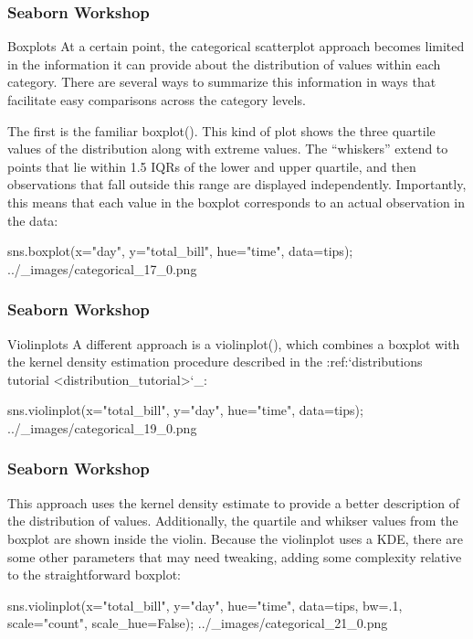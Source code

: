 \begin{frame}[fragile]
\frametitle{Seaborn Workshop}
\large
Boxplots
At a certain point, the categorical scatterplot approach becomes limited in the information it can provide about the distribution of values within each category. There are several ways to summarize this information in ways that facilitate easy comparisons across the category levels.

The first is the familiar boxplot(). This kind of plot shows the three quartile values of the distribution along with extreme values. The “whiskers” extend to points that lie within 1.5 IQRs of the lower and upper quartile, and then observations that fall outside this range are displayed independently. Importantly, this means that each value in the boxplot corresponds to an actual observation in the data:

sns.boxplot(x="day", y="total_bill", hue="time", data=tips);
../_images/categorical_17_0.png
\end{frame}
\begin{frame}[fragile]
\frametitle{Seaborn Workshop}
\large

Violinplots
A different approach is a violinplot(), which combines a boxplot with the kernel density estimation procedure described in the :ref:`distributions tutorial <distribution_tutorial>`_:

sns.violinplot(x="total_bill", y="day", hue="time", data=tips);
../_images/categorical_19_0.png
\end{frame}
\begin{frame}[fragile]
\frametitle{Seaborn Workshop}
\large
This approach uses the kernel density estimate to provide a better description of the distribution of values. Additionally, the quartile and whikser values from the boxplot are shown inside the violin. Because the violinplot uses a KDE, there are some other parameters that may need tweaking, adding some complexity relative to the straightforward boxplot:

sns.violinplot(x="total_bill", y="day", hue="time", data=tips,
               bw=.1, scale="count", scale_hue=False);
../_images/categorical_21_0.png
\end{frame}
